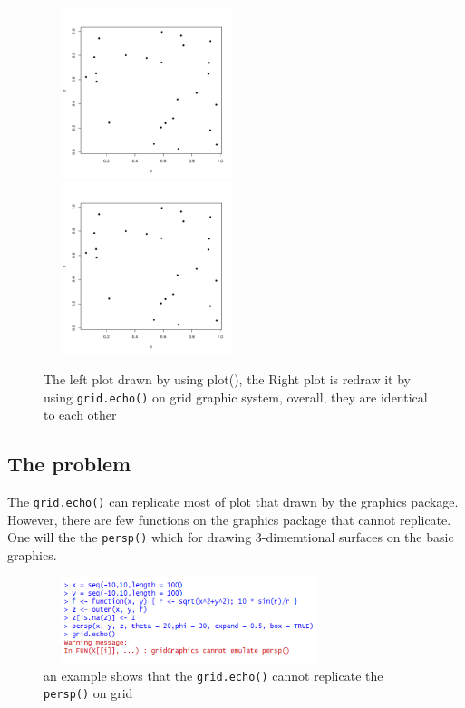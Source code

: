 \documentclass[a4paper,10pt]{article}
\begin{document}
\begin{figure}[h]
\begin{center}
  \includegraphics[height = 5cm, width = 6cm]{figure/basic.pdf}
  \includegraphics[height = 5cm, width = 6cm]{figure/echo.pdf}
  \caption{The left plot drawn by using plot(), the Right plot is redraw it by using \texttt{grid.echo()} on grid graphic system, overall, they are identical to each other}
  	\label{figure1}
\end{center}
\end{figure}

\subsection{The problem}
The \texttt{grid.echo()} can replicate most of plot that drawn by the graphics package. However, there are few functions on the graphics package that cannot replicate. One will the the \texttt{persp()} which for drawing 3-dimemtional surfaces on the basic graphics. 

\begin{figure}[h]
  \includegraphics[height = 2.5cm, width = 8.5cm]{figure/warning.png}
  \caption{an example shows that the \texttt{grid.echo()} cannot replicate the \texttt{persp()} on grid}
  	\label{figure2}
\end{figure}
\end{document}

